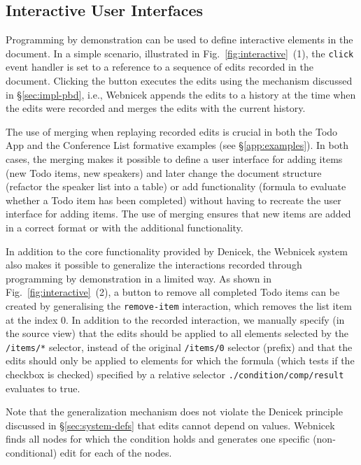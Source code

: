 \documentclass[sigconf,anonymous,screen]{acmart}
\begin{document}

\subsection{Interactive User Interfaces}
\label{sec:impl-interaction}

Programming by demonstration can be used to define interactive elements in the document. In a
simple scenario, illustrated in Fig.~\ref{fig:interactive}~(1), the {\small\Verb_click_} event
handler is set to a reference to a sequence of edits recorded in the document. Clicking the button
executes the edits using the mechanism discussed in \S\ref{sec:impl-pbd}, i.e., Webnicek appends
the edits to a history at the time when the edits were recorded and merges the edits with the
current history.

The use of merging when replaying recorded edits is crucial in both the Todo App and the Conference
List formative examples (see \S\ref{app:examples}). In both cases, the merging makes it possible to define
a user interface for adding items (new Todo items, new speakers) and later change the document
structure (refactor the speaker list into a table) or add functionality (formula to evaluate whether a
Todo item has been completed) without having to recreate the user interface for adding items.
The use of merging ensures that new items are added in a correct format or with the additional
functionality.

In addition to the core functionality provided by Denicek, the Webnicek system also makes it possible
to generalize the interactions recorded through programming by demonstration in a limited way. As shown
in Fig.~\ref{fig:interactive}~(2), a button to remove all completed Todo items can be created by
generalising the {\small\Verb_remove-item_} interaction, which removes the list item at the index 0.
In addition to the recorded interaction, we manually specify (in the source view) that the edits
should be applied to all elements selected by the {\small\Verb_/items/*_} selector, instead of
the original {\small\Verb_/items/0_} selector (prefix) and that the edits should only be
applied to elements for which the formula (which tests if the checkbox is checked) specified by a
relative selector {\small\Verb_./condition/comp/result_} evaluates to true.

Note that the generalization mechanism does not violate the Denicek principle discussed in \S\ref{sec:system-defs}
that edits cannot depend on values. Webnicek finds all nodes for which the condition
holds and generates one specific (non-conditional) edit for each of the nodes.
\end{document}
